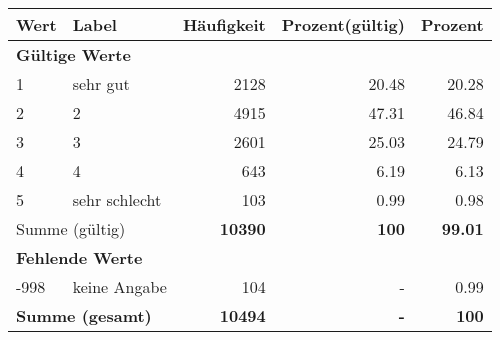      \begin{longtable}{lXrrr}
     \toprule
     \textbf{Wert} & \textbf{Label} & \textbf{Häufigkeit} & \textbf{Prozent(gültig)} & \textbf{Prozent} \\
     \endhead
     \midrule
     \multicolumn{5}{l}{\textbf{Gültige Werte}}\\

     1 &
     \multicolumn{1}{X}{ sehr gut   } &


       \num{2128} &
       \num[round-mode=places,round-precision=2]{20.48} &
         \num[round-mode=places,round-precision=2]{20.28} \\

     2 &
     \multicolumn{1}{X}{ 2   } &


       \num{4915} &
       \num[round-mode=places,round-precision=2]{47.31} &
         \num[round-mode=places,round-precision=2]{46.84} \\

     3 &
     \multicolumn{1}{X}{ 3   } &


       \num{2601} &
       \num[round-mode=places,round-precision=2]{25.03} &
         \num[round-mode=places,round-precision=2]{24.79} \\

     4 &
     \multicolumn{1}{X}{ 4   } &


       \num{643} &
       \num[round-mode=places,round-precision=2]{6.19} &
         \num[round-mode=places,round-precision=2]{6.13} \\

     5 &
     \multicolumn{1}{X}{ sehr schlecht   } &


       \num{103} &
       \num[round-mode=places,round-precision=2]{0.99} &
         \num[round-mode=places,round-precision=2]{0.98} \\
     \midrule
     \multicolumn{2}{l}{Summe (gültig)} &
       \textbf{\num{10390}} &
     \textbf{\num{100}} &
       \textbf{\num[round-mode=places,round-precision=2]{99.01}} \\
     \multicolumn{5}{l}{\textbf{Fehlende Werte}}\\
       -998 &
       keine Angabe &
         \num{104} &
        - &
         \num[round-mode=places,round-precision=2]{0.99} \\
     \midrule
     \multicolumn{2}{l}{\textbf{Summe (gesamt)}} &
          \textbf{\num{10494}} &
        \textbf{-} &
        \textbf{\num{100}} \\
     \bottomrule
     \end{longtable}
     
